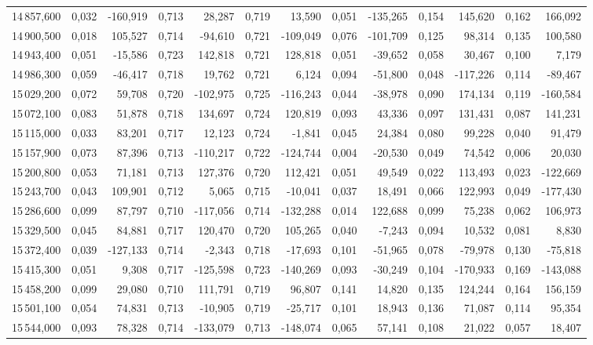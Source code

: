\begin{longtable}{rrrrrrrrrrrrr}
14\,857,600 & 0,032 & -160,919 & 0,713 & 28,287 & 0,719 & 13,590 & 0,051 & -135,265 & 0,154 & 145,620 & 0,162 & 166,092\\
14\,900,500 & 0,018 & 105,527 & 0,714 & -94,610 & 0,721 & -109,049 & 0,076 & -101,709 & 0,125 & 98,314 & 0,135 & 100,580\\
14\,943,400 & 0,051 & -15,586 & 0,723 & 142,818 & 0,721 & 128,818 & 0,051 & -39,652 & 0,058 & 30,467 & 0,100 & 7,179\\
14\,986,300 & 0,059 & -46,417 & 0,718 & 19,762 & 0,721 & 6,124 & 0,094 & -51,800 & 0,048 & -117,226 & 0,114 & -89,467\\
15\,029,200 & 0,072 & 59,708 & 0,720 & -102,975 & 0,725 & -116,243 & 0,044 & -38,978 & 0,090 & 174,134 & 0,119 & -160,584\\
15\,072,100 & 0,083 & 51,878 & 0,718 & 134,697 & 0,724 & 120,819 & 0,093 & 43,336 & 0,097 & 131,431 & 0,087 & 141,231\\
15\,115,000 & 0,033 & 83,201 & 0,717 & 12,123 & 0,724 & -1,841 & 0,045 & 24,384 & 0,080 & 99,228 & 0,040 & 91,479\\
15\,157,900 & 0,073 & 87,396 & 0,713 & -110,217 & 0,722 & -124,744 & 0,004 & -20,530 & 0,049 & 74,542 & 0,006 & 20,030\\
15\,200,800 & 0,053 & 71,181 & 0,713 & 127,376 & 0,720 & 112,421 & 0,051 & 49,549 & 0,022 & 113,493 & 0,023 & -122,669\\
15\,243,700 & 0,043 & 109,901 & 0,712 & 5,065 & 0,715 & -10,041 & 0,037 & 18,491 & 0,066 & 122,993 & 0,049 & -177,430\\
15\,286,600 & 0,099 & 87,797 & 0,710 & -117,056 & 0,714 & -132,288 & 0,014 & 122,688 & 0,099 & 75,238 & 0,062 & 106,973\\
15\,329,500 & 0,045 & 84,881 & 0,717 & 120,470 & 0,720 & 105,265 & 0,040 & -7,243 & 0,094 & 10,532 & 0,081 & 8,830\\
15\,372,400 & 0,039 & -127,133 & 0,714 & -2,343 & 0,718 & -17,693 & 0,101 & -51,965 & 0,078 & -79,978 & 0,130 & -75,818\\
15\,415,300 & 0,051 & 9,308 & 0,717 & -125,598 & 0,723 & -140,269 & 0,093 & -30,249 & 0,104 & -170,933 & 0,169 & -143,088\\
15\,458,200 & 0,099 & 29,080 & 0,710 & 111,791 & 0,719 & 96,807 & 0,141 & 14,820 & 0,135 & 124,244 & 0,164 & 156,159\\
15\,501,100 & 0,054 & 74,831 & 0,713 & -10,905 & 0,719 & -25,717 & 0,101 & 18,943 & 0,136 & 71,087 & 0,114 & 95,354\\
15\,544,000 & 0,093 & 78,328 & 0,714 & -133,079 & 0,713 & -148,074 & 0,065 & 57,141 & 0,108 & 21,022 & 0,057 & 18,407\\

\end{longtable}

